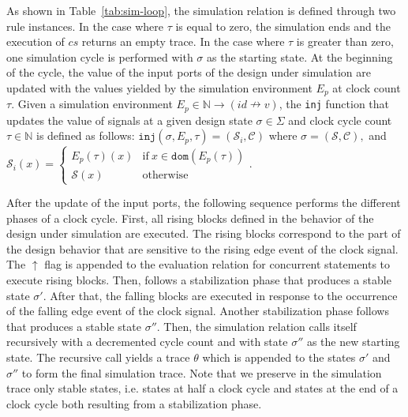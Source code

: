 \documentclass[pdflatex,sn-mathphys]{sn-jnl}%
\theoremstyle{thmstyleone}%
\theoremstyle{thmstyletwo}%
\theoremstyle{thmstylethree}%
\begin{document}
As shown in Table~\ref{tab:sim-loop}, the \hvhdl{} simulation relation
is defined through two rule instances.  In the case where $\tau$ is
equal to zero, the simulation ends and the execution of $cs$ returns
an empty trace. In the case where $\tau$ is greater than zero, one
simulation cycle is performed with $\sigma$ as the starting state. At
the beginning of the cycle, the value of the input ports of the design
under simulation are updated with the values yielded by the simulation
environment $E_p$ at clock count $\tau$. Given a simulation
environment $E_p\in\mathbb{N}\rightarrow(id\nrightarrow{}v)$, the
\texttt{inj} function that updates the value of signals at a given
design state $\sigma\in\Sigma$ and clock cycle count
$\tau\in{}\mathbb{N}$ is defined as follows:
$\mathtt{inj}(\sigma,E_p,\tau)=(\mathcal{S}_i,\mathcal{C})$ where
$\sigma=(\mathcal{S},\mathcal{C}), $ and $\mathcal{S}_i(x)=
\begin{cases}
  E_p(\tau)(x) & \mathrm{if}~x\in\mathtt{dom}(E_p(\tau)) \\
  \mathcal{S}(x) & \mathrm{otherwise}
\end{cases}$.

After the update of the input ports, the following sequence performs
the different phases of a clock cycle. First, all rising blocks
defined in the behavior of the design under simulation are
executed. The rising blocks correspond to the part of the design
behavior that are sensitive to the rising edge event of the clock
signal. %
The $\uparrow$ flag is appended to the evaluation relation for
concurrent statements to execute rising blocks. Then, follows a
stabilization phase that produces a stable state $\sigma'$. After
that, the falling blocks are executed in response to the occurrence of
the falling edge event of the clock signal. Another stabilization
phase follows that produces a stable state $\sigma''$.  Then, the
\hvhdl{} simulation relation calls itself recursively with a
decremented cycle count and with state $\sigma''$ as the new starting
state. The recursive call yields a trace $\theta$ which is appended to
the states $\sigma'$ and $\sigma''$ to form the final simulation
trace. Note that we preserve in the simulation trace only stable
states, i.e. states at half a clock cycle and states at the end of a
clock cycle both resulting from a stabilization phase.
\end{document}
